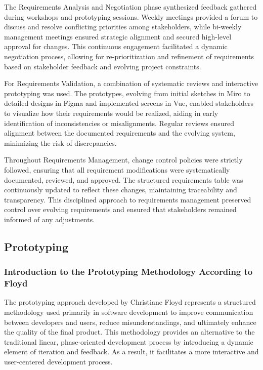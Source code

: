The Requirements Analysis and Negotiation phase synthesized feedback gathered during workshops and prototyping sessions.
Weekly meetings provided a forum to discuss and resolve conflicting priorities among stakeholders, while bi-weekly
management meetings ensured strategic alignment and secured high-level approval for changes. This continuous engagement
facilitated a dynamic negotiation process, allowing for re-prioritization and refinement of requirements based on
stakeholder feedback and evolving project constraints.

For Requirements Validation, a combination of systematic reviews and interactive prototyping was used. The prototypes,
evolving from initial sketches in Miro to detailed designs in Figma and implemented screens in Vue, enabled stakeholders
to visualize how their requirements would be realized, aiding in early identification of inconsistencies or
misalignments. Regular reviews ensured alignment between the documented requirements and the evolving system, minimizing
the risk of discrepancies.

Throughout Requirements Management, change control policies were strictly followed, ensuring that all requirement
modifications were systematically documented, reviewed, and approved. The structured requirements table was continuously
updated to reflect these changes, maintaining traceability and transparency. This disciplined approach to requirements
management preserved control over evolving requirements and ensured that stakeholders remained informed of any
adjustments.


\subsection{Prototyping}\label{subsec:prototyping}

\subsubsection{Introduction to the Prototyping Methodology According to Floyd}\label{subsubsec:ptintro}

The prototyping approach developed by Christiane Floyd represents a structured methodology used primarily in software
development to improve communication between developers and users, reduce misunderstandings, and ultimately enhance the
quality of the final product.\autocite[cf.][p.2--3]{floydSystematicLookPrototyping1984} This methodology provides an
alternative to the traditional linear, phase-oriented development process by introducing a dynamic element of iteration
and feedback.\autocite[cf.][p.3]{floydSystematicLookPrototyping1984} As a result, it facilitates a more
interactive and user-centered development process.\autocite[cf.][p.3--4]{floydSystematicLookPrototyping1984}

